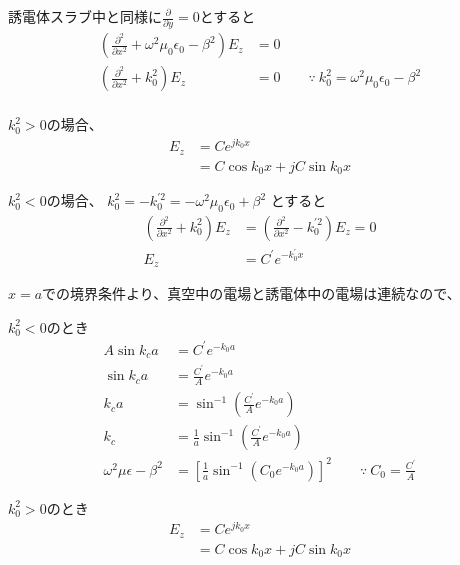\documentclass[a4paper,10pt]{bxjsarticle}
\begin{document}
誘電体スラブ中と同様に$\frac{\partial}{\partial y} = 0$とすると
\begin{align*}
    \left( 
        \frac{\partial^2}{\partial x^2} 
        + \omega^2 \mu_0 \epsilon_0 - \beta^2 
    \right) E_z
    & = 0 \\
    \left( 
        \frac{\partial^2}{\partial x^2} 
        + k_0^2
    \right) E_z
    & = 0 \qquad
    \because \ k_0^2 = \omega^2 \mu_0 \epsilon_0 - \beta^2 \\
\end{align*}

$k_0^2 > 0$の場合、
\begin{align*}
    E_z &= C e^{j k_0 x} \\
        &= C \cos k_0 x + j C \sin k_0 x
\end{align*}

$k_0^2 < 0$の場合、
$k_0^2 = - k_0^{\prime 2} = - \omega^2 \mu_0 \epsilon_0 + \beta^2$ とすると
\begin{align*}
    \left( 
        \frac{\partial^2}{\partial x^2} 
        + k_0^2
    \right) E_z
    & =
    \left( 
        \frac{\partial^2}{\partial x^2} 
        - k_0^{\prime 2}
    \right) E_z
    = 0 \\
    E_z &= C^\prime e^{- k_0^\prime x}
\end{align*}

$x=a$での境界条件より、真空中の電場と誘電体中の電場は連続なので、

$k_0^2 < 0$のとき
\begin{align*}
    A \sin k_c a & = C^\prime e^{- k_0 a} \\
    \sin k_c a & = \frac{C^\prime}{A} e^{- k_0 a} \\
    k_c a & = \sin^{-1} \left( \frac{C^\prime}{A} e^{- k_0 a} \right) \\
    k_c & = \frac{1}{a} \sin^{-1} \left( \frac{C^\prime}{A} e^{- k_0 a} \right) \\
    \omega^2 \mu \epsilon - \beta^2 &= 
        \left[ 
            \frac{1}{a} \sin^{-1} \left( C_0 e^{- k_0 a} \right)
        \right]^2 \qquad
    \because \ C_0 = \frac{C^\prime}{A}
\end{align*}

$k_0^2 > 0$のとき
\begin{align*}
    E_z &= C e^{j k_0 x} \\
        &= C \cos k_0 x + j C \sin k_0 x
\end{align*}
\end{document}
